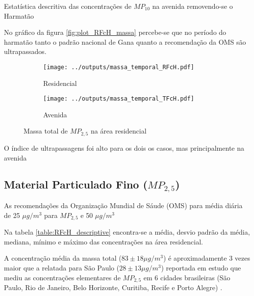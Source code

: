\begin{table}[H]
  \centering
    
  \caption{Estatística descritiva das concentrações de $MP_{10}$ na 
           avenida removendo-se o Harmatão
           \label{table:TIsH_descriptive}}
\end{table}

No gráfico da figura \ref{fig:plot_RFcH_massa} percebe-se que no período 
do harmatão tanto o padrão nacional de Gana quanto a recomendação da OMS 
são ultrapassados.

\begin{figure}[H]
  \centering
  \begin{subfigure}[b]{0.45\textwidth}
    \texttt{[image: ../outputs/massa\_temporal\_RFcH.pdf]}
    \caption{Residencial}
  \end{subfigure}%
  \begin{subfigure}[b]{0.45\textwidth}
    \texttt{[image: ../outputs/massa\_temporal\_TFcH.pdf]}
    \caption{Avenida}
  \end{subfigure}
  \caption{Massa total de $MP_{2,5}$ na área residencial \label{fig:massa_temporal_fino}}
\end{figure}

O índice de ultrapassagens foi alto para os dois os casos, 
mas principalmente na avenida

\subsection{Material Particulado Fino ($MP_{2,5}$)}

As recomendações da Organização Mundial de Sáude (OMS) para média diária de 
25 $\mu g/m^3$ para $MP_{2,5}$ e 50 $\mu g/m^3$ 

\begin{landscape}
  \begin{table}[H]
    \centering
    
    \caption{}
  \end{table} 
\end{landscape}

Na tabela \ref{table:RFcH_descriptive} encontra-se a média, desvio padrão da média, 
mediana, mínimo e máximo das concentrações na área residencial. 

A concentração média da massa total ($83\pm 18 \mu g / m^3$) é aproximadamente
3 vezes maior que a relatada para São Paulo ($28\pm 13 \mu g / m^3$) reportada 
em estudo que mediu as concentrações elementares de $MP_{2,5}$ em 6 cidades 
brasileiras (São Paulo, Rio de Janeiro, Belo Horizonte, Curitiba, Recife e 
Porto Alegre) \cite{andrade2012}. 

